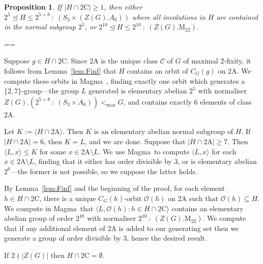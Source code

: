\documentclass[11pt, a4paper]{amsart}
\makeatletter
\newcommand{\magma}{{\sc Magma}}
\def\cn{\mathord{{\!\:{:}\:\!}}}
\newtheorem{prop}[thm]{Proposition}
\renewcommand{\proofname}{Proof}
\renewenvironment{proof}[1][\proofname]{\par
  \pushQED{\qed}  \normalfont \partopsep=\z@skip \topsep=\z@skip
  \trivlist
  \item[\hskip\labelsep
        \scshape
    #1\@addpunct{.}]\ignorespaces
}{  \popQED\endtrivlist\@endpefalse
}
\makeatother
\begin{document}
\begin{prop}\label{prop:Fi222local}
    If $|H\cap\mathrm{2C}|\geq 1$, then either $2^{5}\trianglelefteq H\leq 2^{5+8}\cn( S_3\times (Z(G).A_6))$ where all involutions in $H$ are contained in the normal subgroup $2^5$, or $2^{10}\trianglelefteq H\leq 2^{10}\cn(Z(G).\mathrm{M}_{22})$.
\end{prop}
\begin{proof}
    Suppose $g\in H\cap \mathrm{2C}$. Since $\mathrm{2A}$ is the unique class $\mathcal{C}$ of $G$ of maximal 2-fixity, it follows from Lemma~\ref{lem:Finf} that $H$ contains an orbit of $C_G(g)$ on $\mathrm{2A}$. We compute these orbits in \magma~\cite{magma}, finding exactly one orbit which generates a $\{2,7\}$-group---the group $L$ generated is elementary abelian $2^5$ with normaliser $Z(G).(2^{5+8}\cn( S_3\times  A_6))<_{\max}G$, and contains exactly $6$ elements of class $\mathrm{2A}$. 
    
    Let $K:=\langle H\cap\mathrm{2A}\rangle$. Then $K$ is an elementary abelian normal subgroup of $H$. If $|H\cap \mathrm{2A}|=6$, then $K=L$, and we are done. Suppose that $|H\cap\mathrm{2A}|\geq 7$. Then $\langle L,x\rangle\leq K$ for some $x\in\mathrm{2A}\setminus L$. We use \magma~to compute $\langle L,x\rangle$ for each $x\in\mathrm{2A}\setminus L$, finding that it either has order divisible by 3, or is elementary abelian $2^6$---the former is not possible, so we suppose the latter holds. 
    
    By Lemma~\ref{lem:Finf} and the beginning of the proof, for each element $h\in H\cap\mathrm{2C}$, there is a unique $C_G(h)$-orbit $\mathcal{O}(h)$ on $\mathrm{2A}$ such that $\mathcal{O}(h)\subseteq H$. We compute in \magma~that $\langle L,\mathcal{O}(h) : h \in H\cap\mathrm{2C}\rangle$ contains an elementary abelian group of order $2^{10}$ with normaliser $2^{10}\cn(Z(G).\mathrm{M}_{22})$. We compute that if any additional element of $\mathrm{2A}$ is added to our generating set then we generate a group of order divisible by 3, hence the desired result. 
            \end{proof}
\begin{cor}\label{cor:Fi22no2C}
    If $2\nmid |Z(G)|$ then $H\cap \mathrm{2C}=\emptyset$.
\end{cor}
\end{document}
